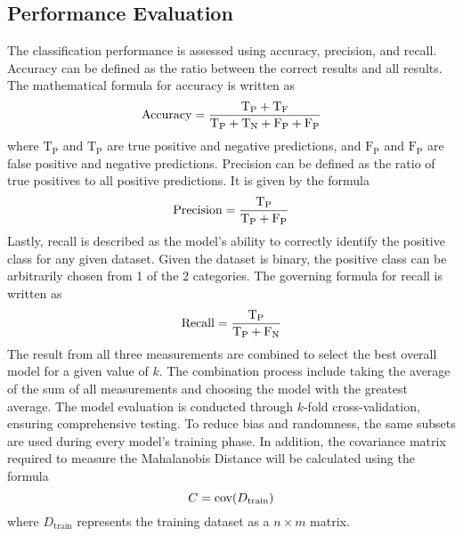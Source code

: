 \documentclass[twocolumn, a4paper, 8pt]{article}
\newcommand{\sups}[1]{\textsuperscript{#1}}
\begin{document}
	\subsection{Performance Evaluation}
	The classification performance is assessed using accuracy, precision, and recall\sups{\cite{google_2024_classification}}. Accuracy can be defined as the ratio between the correct results and all results. The mathematical formula for accuracy is written as
	\begin{equation*}
		\centering
		\text{Accuracy} = \frac{\text{T}_\text{P} + \text{T}_\text{F}}{\text{T}_\text{P} + \text{T}_\text{N} + \text{F}_\text{P} + \text{F}_\text{P}}
	\end{equation*}
	where $\text{T}_\text{P}$ and $\text{T}_\text{P}$ are true positive and negative predictions, and $\text{F}_\text{P}$ and $\text{F}_\text{P}$ are false positive and negative predictions. Precision can be defined as the ratio of true positives to all positive predictions. It is given by the formula
	\begin{equation*}
		\centering
		\text{Precision} = \frac{\text{T}_\text{P}}{\text{T}_\text{P} + \text{F}_\text{P}}
	\end{equation*}
	Lastly, recall is described as the model's ability to correctly identify the positive class for any given dataset. Given the dataset is binary, the positive class can be arbitrarily chosen from 1 of the 2 categories. The governing formula for recall is written as
	\begin{equation*}
		\centering
		\text{Recall} = \frac{\text{T}_\text{P}}{\text{T}_\text{P} + \text{F}_\text{N}}
	\end{equation*}
	The result from all three measurements are combined to select the best overall model for a given value of $k$. The combination process include taking the average of the sum of all measurements and choosing the model with the greatest average. The model evaluation is conducted through $k$-fold cross-validation, ensuring comprehensive testing. To reduce bias and randomness, the same subsets are used during every model's training phase. In addition, the covariance matrix required to measure the Mahalanobis Distance will be calculated using the formula
	\begin{equation*}
		\centering
		C = \text{cov}(D_\text{train})
	\end{equation*}
	where $D_\text{train}$ represents the training dataset as a $n \times m$ matrix.\\
	
\end{document}
